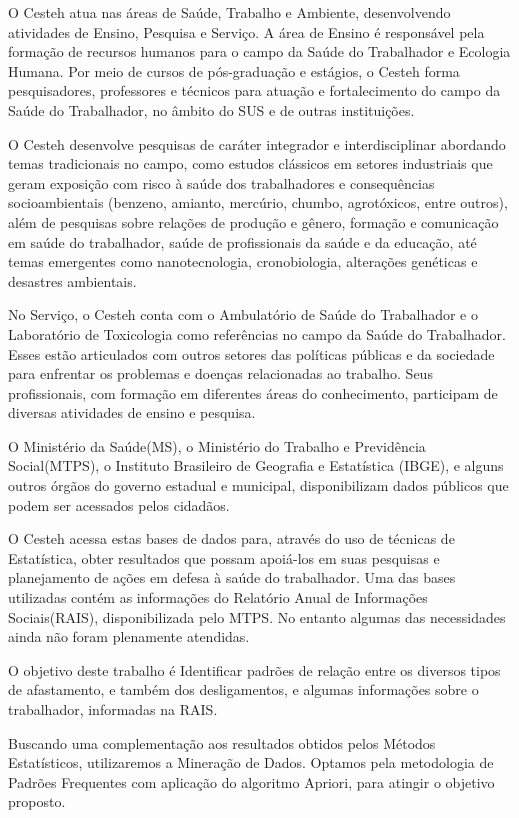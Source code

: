 \documentclass[12pt]{article}
\begin{document}
O Cesteh atua nas áreas de Saúde, Trabalho e Ambiente, desenvolvendo atividades de Ensino, Pesquisa e Serviço.
A área de Ensino é responsável pela formação de recursos humanos para o campo da Saúde do Trabalhador e Ecologia Humana. Por meio de cursos de pós-graduação e estágios, o Cesteh forma pesquisadores, professores e técnicos para atuação e fortalecimento do campo da Saúde do Trabalhador, no âmbito do SUS e de outras instituições.\cite{Silva2000}

O Cesteh desenvolve pesquisas de caráter integrador e interdisciplinar abordando temas tradicionais no campo, como estudos clássicos em setores industriais que geram exposição com risco à saúde dos trabalhadores e consequências socioambientais (benzeno, amianto, mercúrio, chumbo, agrotóxicos, entre outros), além de pesquisas sobre relações de produção e gênero, formação e comunicação em saúde do trabalhador, saúde de profissionais da saúde e da educação, até temas emergentes como nanotecnologia, cronobiologia, alterações genéticas e desastres ambientais.

No Serviço, o Cesteh conta com o Ambulatório de Saúde do Trabalhador e o Laboratório de Toxicologia como referências no campo da Saúde do Trabalhador. Esses estão articulados com outros setores das políticas públicas e da sociedade para enfrentar os problemas e doenças relacionadas ao trabalho. Seus profissionais, com formação em diferentes áreas do conhecimento, participam de diversas atividades de ensino e pesquisa.

O Ministério da Saúde(MS), o Ministério do Trabalho e Previdência Social(MTPS), o Instituto Brasileiro de Geografia e Estatística (IBGE), e alguns outros órgãos do governo estadual e municipal, disponibilizam dados públicos que podem ser acessados pelos cidadãos.

O Cesteh acessa estas bases de dados para, através do uso de técnicas de Estatística, obter resultados que possam apoiá-los em suas pesquisas e planejamento de ações em defesa à saúde do trabalhador. Uma das bases utilizadas contém as informações do Relatório Anual de Informações Sociais(RAIS), disponibilizada pelo MTPS. No entanto algumas das necessidades ainda não foram plenamente atendidas. 

O objetivo deste trabalho é Identificar padrões de relação entre os diversos tipos de afastamento, e também dos desligamentos, e algumas informações sobre o  trabalhador, informadas na RAIS.

Buscando uma complementação aos resultados obtidos pelos Métodos Estatísticos, utilizaremos a Mineração de Dados. Optamos pela metodologia de Padrões Frequentes com aplicação do algoritmo Apriori,  para atingir o objetivo proposto.
\end{document}
